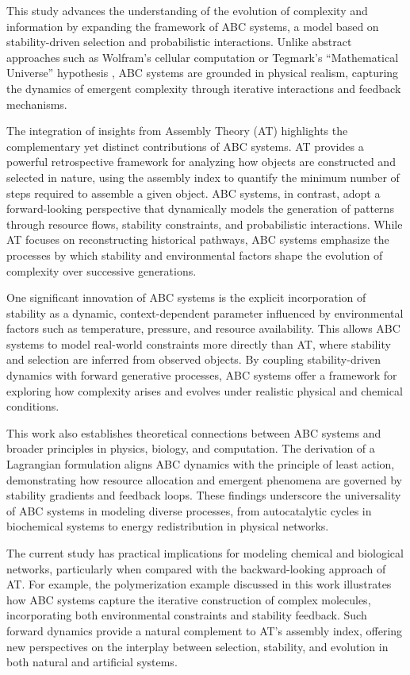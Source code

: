 \documentclass[entropy,article,submit,pdftex,oneauthor]{Definitions/mdpi}
\begin{document}
This study advances the understanding of the evolution of complexity and information by expanding the framework of ABC systems, a model based on stability-driven selection and probabilistic interactions. Unlike abstract approaches such as Wolfram’s cellular computation \cite{wolfram2020fundamental} or Tegmark’s “Mathematical Universe” hypothesis \cite{tegmark2008mathematical}, ABC systems are grounded in physical realism, capturing the dynamics of emergent complexity through iterative interactions and feedback mechanisms.

The integration of insights from Assembly Theory (AT) \cite{walker2023nature} highlights the complementary yet distinct contributions of ABC systems. AT provides a powerful retrospective framework for analyzing how objects are constructed and selected in nature, using the assembly index to quantify the minimum number of steps required to assemble a given object. ABC systems, in contrast, adopt a forward-looking perspective that dynamically models the generation of patterns through resource flows, stability constraints, and probabilistic interactions. While AT focuses on reconstructing historical pathways, ABC systems emphasize the processes by which stability and environmental factors shape the evolution of complexity over successive generations. 

One significant innovation of ABC systems is the explicit incorporation of stability as a dynamic, context-dependent parameter influenced by environmental factors such as temperature, pressure, and resource availability. This allows ABC systems to model real-world constraints more directly than AT, where stability and selection are inferred from observed objects. By coupling stability-driven dynamics with forward generative processes, ABC systems offer a framework for exploring how complexity arises and evolves under realistic physical and chemical conditions.

This work also establishes theoretical connections between ABC systems and broader principles in physics, biology, and computation. The derivation of a Lagrangian formulation aligns ABC dynamics with the principle of least action, demonstrating how resource allocation and emergent phenomena are governed by stability gradients and feedback loops. These findings underscore the universality of ABC systems in modeling diverse processes, from autocatalytic cycles in biochemical systems to energy redistribution in physical networks.

The current study has practical implications for modeling chemical and biological networks, particularly when compared with the backward-looking approach of AT. For example, the polymerization example discussed in this work illustrates how ABC systems capture the iterative construction of complex molecules, incorporating both environmental constraints and stability feedback. Such forward dynamics provide a natural complement to AT’s assembly index, offering new perspectives on the interplay between selection, stability, and evolution in both natural and artificial systems.
\end{document}
